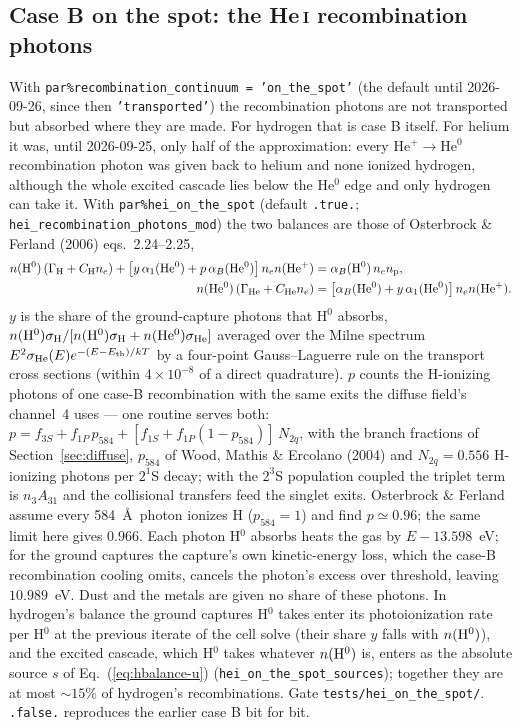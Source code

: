 \documentclass[english,a4paper]{my_memo}
\newcommand{\code}[1]{\texttt{#1}}
\begin{document}
\subsection{Case B on the spot: the He\,\textsc{i} recombination photons}
\label{sec:ots-hei}
With \code{par\%recombination\_continuum = 'on\_the\_spot'} (the default until 2026-09-26, since then \code{'transported'}) the
recombination photons are not transported but absorbed where they are made.
For hydrogen that is case B itself.  For helium it was, until 2026-09-25,
only half of the approximation: every He$^+\rightarrow$He$^0$ recombination
photon was given back to helium and none ionized hydrogen, although the whole
excited cascade lies below the He$^0$ edge and only hydrogen can take it.
With \code{par\%hei\_on\_the\_spot} (default \code{.true.};
\code{hei\_recombination\_photons\_mod}) the two balances are those of
Osterbrock \& Ferland (2006) eqs.~2.24--2.25,
\begin{align}
 n({\rm H^0})\,(\Gamma_{\rm H} + C_{\rm H}n_e)
   + \bigl[y\,\alpha_1({\rm He^0}) + p\,\alpha_B({\rm He^0})\bigr]\,n_e n({\rm He^+})
   &= \alpha_B({\rm H^0})\,n_e n_{\rm p}, \\
 n({\rm He^0})\,(\Gamma_{\rm He} + C_{\rm He}n_e)
   &= \bigl[\alpha_B({\rm He^0}) + y\,\alpha_1({\rm He^0})\bigr]\,n_e n({\rm He^+}).
\end{align}
$y$ is the share of the ground-capture photons that H$^0$ absorbs,
$n({\rm H^0})\sigma_{\rm H}/[n({\rm H^0})\sigma_{\rm H} + n({\rm He^0})\sigma_{\rm He}]$
averaged over the Milne spectrum $E^2\sigma_{\rm He}(E)e^{-(E-E_{\rm th})/kT}$
by a four-point Gauss--Laguerre rule on the transport cross sections
(within $4\times10^{-8}$ of a direct quadrature).  $p$ counts the
H-ionizing photons of one case-B recombination with the same exits the
diffuse field's channel~4 uses --- one routine serves both:
$p = f_{3S} + f_{1P}\,p_{584} + [f_{1S} + f_{1P}(1-p_{584})]\,N_{2q}$, with the
branch fractions of Section~\ref{sec:diffuse}, $p_{584}$ of Wood, Mathis \&
Ercolano (2004) and $N_{2q} = 0.556$ H-ionizing photons per $2^1$S decay; with
the $2^3$S population coupled the triplet term is $n_3A_{31}$ and the
collisional transfers feed the singlet exits.  Osterbrock \& Ferland assume
every 584~\AA\ photon ionizes H ($p_{584}=1$) and find $p\simeq0.96$; the
same limit here gives $0.966$.  Each photon H$^0$ absorbs heats the gas by
$E - 13.598$~eV; for the ground captures the capture's own kinetic-energy
loss, which the case-B recombination cooling omits, cancels the photon's
excess over threshold, leaving $10.989$~eV.  Dust and the metals are given
no share of these photons.  In hydrogen's balance the ground captures
H$^0$ takes enter its photoionization rate per H$^0$ at the previous
iterate of the cell solve (their share $y$ falls with $n({\rm H^0})$), and
the excited cascade, which H$^0$ takes whatever $n({\rm H^0})$ is, enters
as the absolute source $s$ of Eq.~(\ref{eq:hbalance-u})
(\code{hei\_on\_the\_spot\_sources}); together they are at most
${\sim}15\%$ of hydrogen's recombinations.
Gate \code{tests/hei\_on\_the\_spot/}.  \code{.false.} reproduces the
earlier case B bit for bit.
\end{document}
